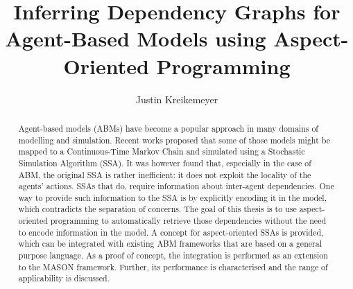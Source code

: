 \documentclass[a4paper, 12pt, bibliography=numbered]{article}
\title{Inferring Dependency Graphs for Agent-Based Models using Aspect-Oriented Programming}
\author{Justin Kreikemeyer}
\begin{document}
    \maketitle

    \begin{abstract}

        Agent-based models (ABMs) have become a popular approach in many domains of modelling and simulation.
        Recent works proposed that some of those models might be mapped to a Continuous-Time Markov Chain and simulated using a Stochastic Simulation Algorithm (SSA).
        It was however found that, especially in the case of ABM, the original SSA is rather inefficient:
        it does not exploit the locality of the agents' actions.
        SSAs that do, require information about inter-agent dependencies.
        One way to provide such information to the SSA is by explicitly encoding it in the model, which contradicts the separation of concerns.
        The goal of this thesis is to use aspect-oriented programming to automatically retrieve those dependencies without the need to encode information in the model.
        A concept for aspect-oriented SSAs is provided, which can be integrated with existing ABM frameworks that are based on a general purpose language.
        As a proof of concept, the integration is performed as an extension to the MASON framework.
        Further, its performance is characterised and the range of applicability is discussed.

    \end{abstract}
\end{document}
